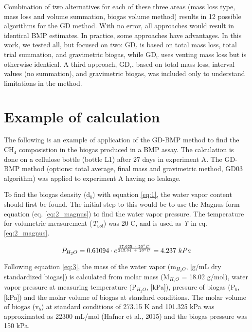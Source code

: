 \documentclass[]{article}
\begin{document}
Combination of two alternatives for each of these three areas (mass loss type, mass loss and volume summation, biogas volume method) results in 12 possible algorithms for the GD method. With no error, all approaches would result in identical BMP estimates. In practice, some approaches have advantages. In this work, we tested all, but focused on two: GD$_t$ is based on total mass loss, total trial summation, and gravimetric biogas, while GD$_v$ uses venting mass loss but is otherwise identical. A third approach, GD$_i$, based on total mass loss, interval values (no summation), and gravimetric biogas, was included only to understand limitations in the method.

\section{Example of calculation} \label{s_example}
The following is an example of application of the GD-BMP method to find the CH$_4$ composistion in the biogas produced in a BMP assay. The calculation is done on a cellulose bottle (bottle L1) after 27 days in experiment A.
The GD-BMP method (options: total average, final mass and gravimetric method, GD03 algorithm) was applied to experiment A having no leakage.

To find the biogas density (d$_b$) with equation \ref{eq:1}, the water vapor content should first be found. The initial step to this would be to use the Magnus-form equation (eq. \ref{eq:2_magnus}) to find the water vapor pressure. The temperature for volumetric measurement (\textit{T}$_{vol}$) was 20 \degree C, and is used as \textit{T} in eq. \ref{eq:2_magnus}.

\begin{equation*}
\centering
   P_{H_2O} = 0.61094 \cdot e^{\frac{17.625\ \cdot\ 20 \degree C}{243.04\ +\ 20 \degree C}} = 4.237\ kPa
\end{equation*}

 

\noindent Following equation \ref{eq:3}, the mass of the water vapor (m$_{H_2O}$, [g/mL dry standardized biogas]) is calculated from molar mass (M$_{H_2O}$ = 18.02 g/mol), water vapor pressure at measuring temperature (P$_{H_2O}$, [kPa]), pressure of biogas (P$_b$, [kPa]) and the molar volume of biogas at standard conditions. The molar volume of biogas (v$_b$) at standard conditions of 273.15 \degree K and 101.325 kPa was approximated as 22300 mL/mol (Hafner et al., 2015) and the biogas pressure was 150 kPa.
\end{document}
